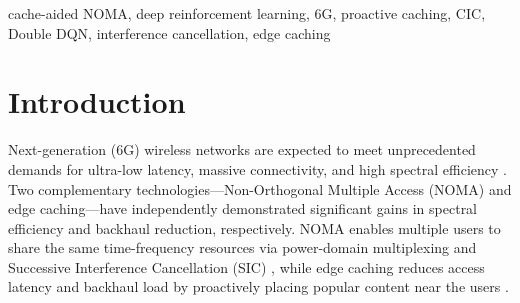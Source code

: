 \documentclass[conference]{IEEEtran}
\begin{document}
\begin{abstract}
This paper proposes a Deep Reinforcement Learning (DRL) based proactive caching framework for Cache-aided Non-Orthogonal Multiple Access (NOMA) downlink systems targeting 6G networks. While caching and NOMA are promising complementary technologies, traditional reactive caching policies fail to optimize for Cache-aided Interference Cancellation (CIC) opportunities. The proposed scheme employs a Double Dueling Deep Q-Network (DQN) agent with a novel binary action space to make online cache placement decisions. By incorporating a CIC-aware reward function, the agent is explicitly incentivized to proactively cache files that enable interference suppression for paired NOMA users. Simulated under a realistic mixed fading channel model with imperfect Successive Interference Cancellation (SIC), results over 5 million training steps and 100 Monte Carlo evaluation runs demonstrate exceptional performance. The proposed DQN scheme achieves a cache hit rate of 70.38\%, a CIC benefit rate of 3.78 (a 5.28x improvement over the best dynamic baseline), and a sum-rate of 18.17 bps/Hz at an SNR of 30 dB. Furthermore, the proposed policy reduces system outage probability by 14x compared to the no-caching baseline, performing within 0.54\% of the oracle-optimal Top-K policy without relying on prior knowledge of the content popularity distribution.
\end{abstract}

\begin{IEEEkeywords}
cache-aided NOMA, deep reinforcement learning, 6G, proactive caching, CIC, Double DQN, interference cancellation, edge caching
\end{IEEEkeywords}


\section{Introduction}

Next-generation (6G) wireless networks are expected to meet unprecedented demands for ultra-low latency, massive connectivity, and high spectral efficiency \cite{b_ding_survey}. Two complementary technologies---Non-Orthogonal Multiple Access (NOMA) and edge caching---have independently demonstrated significant gains in spectral efficiency and backhaul reduction, respectively. NOMA enables multiple users to share the same time-frequency resources via power-domain multiplexing and Successive Interference Cancellation (SIC) \cite{b_dai_noma, b_ding_survey}, while edge caching reduces access latency and backhaul load by proactively placing popular content near the users \cite{b_maddah_ali, b_golrezaei}.
\end{document}
